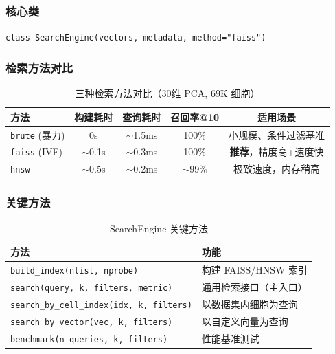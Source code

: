 \documentclass[12pt,a4paper]{ctexart}
\begin{document}
\subsubsection{核心类}

\texttt{class SearchEngine(vectors, metadata, method="faiss")}

\subsubsection{检索方法对比}

\begin{table}[H]
\centering
\caption{三种检索方法对比（30维 PCA, 69K 细胞）}
\begin{tabular}{l|c|c|c|c}
\toprule
\textbf{方法} & \textbf{构建耗时} & \textbf{查询耗时} & \textbf{召回率@10} & \textbf{适用场景} \\
\midrule
\texttt{brute}  (暴力) & 0s       & $\sim$1.5ms & 100\%     & 小规模、条件过滤基准 \\
\texttt{faiss}  (IVF)  & $\sim$0.1s & $\sim$0.3ms & 100\%     & \textbf{推荐}，精度高+速度快 \\
\texttt{hnsw}          & $\sim$0.5s & $\sim$0.2ms & $\sim$99\% & 极致速度，内存稍高 \\
\bottomrule
\end{tabular}
\end{table}

\subsubsection{关键方法}

\begin{table}[H]
\centering
\caption{SearchEngine 关键方法}
\begin{tabular}{l|p{7cm}}
\toprule
\textbf{方法} & \textbf{功能} \\
\midrule
\texttt{build\_index(nlist, nprobe)}     & 构建 FAISS/HNSW 索引 \\
\texttt{search(query, k, filters, metric)} & 通用检索接口（主入口） \\
\texttt{search\_by\_cell\_index(idx, k, filters)} & 以数据集内细胞为查询 \\
\texttt{search\_by\_vector(vec, k, filters)} & 以自定义向量为查询 \\
\texttt{benchmark(n\_queries, k, filters)} & 性能基准测试 \\
\bottomrule
\end{tabular}
\end{table}
\end{document}
